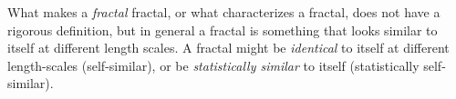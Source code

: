 What makes a \emph{fractal} fractal, or what characterizes a fractal, does not have a rigorous definition, but in general a fractal is something that looks similar to itself at different length scales. A fractal might be \emph{identical} to itself at different length-scales (self-similar), or be \emph{statistically similar} to itself (statistically self-similar). %



% 
% 
